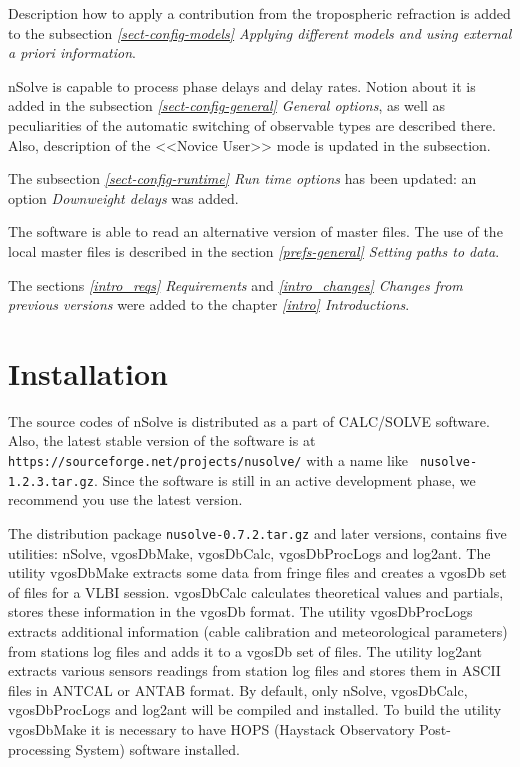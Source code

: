 \documentclass [10pt,letterpaper]{report}
\newcommand{\nuSolve}{\greektext n\latintext Solve}
\begin{document}
{Description how to apply a contribution from the tropospheric refraction is added to the subsection
\emph{\ref{sect-config-models} Applying different models and using external a priori information}.

\nuSolve{} is capable to process phase delays and delay rates. Notion about it
is added in the subsection \emph{\ref{sect-config-general} General options}, as
well as peculiarities of the automatic switching of observable types are described
there. Also, description of the <<Novice User>> mode is updated in the subsection.

The subsection \emph{\ref{sect-config-runtime} Run time options} has been updated:
an option {\sl Downweight delays} was added.

The software is able to read an alternative version of master files. The
use of the local master files is described in the section
\emph{\ref{prefs-general} Setting paths to data}.

The sections \emph{\ref{intro_reqs} Requirements} and
\emph{\ref{intro_changes} Changes from previous versions} were added to
the chapter \emph{\ref{intro} Introductions}.








%
%
\chapter{Installation}
\label{chapter-installation}

The source codes of \nuSolve{} is distributed as a part of CALC/SOLVE
software. Also, the latest stable version of the software is at {\tt
https://sourceforge.net/projects/nusolve/} with a name like {\tt
nusolve-1.2.3.tar.gz}. Since the software is still in an active
development phase, we recommend you use the latest version.

The distribution package {\tt nusolve-0.7.2.tar.gz} and later versions,
contains five utilities: \nuSolve{}, vgosDbMake, vgosDbCalc, vgosDbProcLogs
and log2ant.
The utility vgosDbMake extracts some data from fringe files and creates a
vgosDb set of files for a VLBI session. vgosDbCalc calculates theoretical
values and partials, stores these information in the vgosDb format. The
utility vgosDbProcLogs extracts additional information (cable calibration
and meteorological parameters) from stations log files and adds it to a
vgosDb set of files. The utility log2ant extracts various sensors readings from 
station log files and stores them in ASCII files in ANTCAL or ANTAB format.
By default, only \nuSolve{}, vgosDbCalc,
vgosDbProcLogs and log2ant will be compiled and installed. To build the utility
vgosDbMake it is necessary to have HOPS (Haystack Observatory
Post-processing System) software installed. 

}
\end{document}
